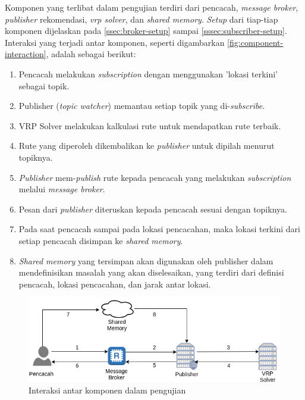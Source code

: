 Komponen yang terlibat dalam pengujian terdiri dari pencacah, \textit{message broker}, \textit{publisher} rekomendasi, \textit{vrp solver}, dan \textit{shared memory}. \textit{Setup} dari tiap-tiap komponen dijelaskan pada \autoref{ssec:broker-setup} sampai \autoref{sssec:subscriber-setup}. Interaksi yang terjadi antar komponen, seperti digambarkan \autoref{fig:component-interaction}, adalah sebagai berikut:


\begin{enumerate}
	\item Pencacah melakukan \textit{subscription} dengan menggunakan 'lokasi terkini' sebagai topik.
	\item Publisher (\textit{topic watcher}) memantau setiap topik yang di-\textit{subscribe}.
	\item VRP Solver melakukan kalkulasi rute untuk mendapatkan rute terbaik.
	\item Rute yang diperoleh dikembalikan ke \textit{publisher} untuk dipilah menurut topiknya.
	\item \textit{Publisher} mem-\textit{publish} rute kepada pencacah yang melakukan \textit{subscription} melalui \textit{message broker}.
	\item Pesan dari \textit{publisher} diteruskan kepada pencacah sesuai dengan topiknya.
	\item Pada saat pencacah sampai pada lokasi pencacahan, maka lokasi terkini dari setiap pencacah disimpan ke \textit{shared memory}.
	\item \textit{Shared memory} yang tersimpan akan digunakan oleh publisher dalam mendefinisikan masalah yang akan diselesaikan, yang terdiri dari definisi pencacah, lokasi pencacahan, dan jarak antar lokasi.
\end{enumerate}


\begin{figure}[!]
	\centering
	\includegraphics[width=\textwidth]{Resources/Images/component-interaction}
	\captionsetup{format=hang}
	\caption{Interaksi antar komponen dalam pengujian}
	\label{fig:component-interaction}
\end{figure}


